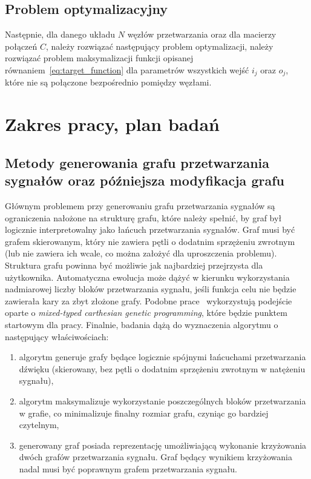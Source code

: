 \subsection{Problem optymalizacyjny}

Następnie, dla danego układu $N$ węzłów przetwarzania oraz dla macierzy połączeń $C$, 
należy rozwiązać następujący problem optymalizacji, należy rozwiązać problem
maksymalizacji funkcji opisanej równaniem~\ref{eq:target_function} dla
parametrów wszystkich wejść $i_j$ oraz $o_j$, które nie są połączone bezpośrednio
pomiędzy węzłami.




\section{Zakres pracy, plan badań}

\subsection{Metody generowania grafu przetwarzania sygnałów oraz późniejsza modyfikacja grafu}

Głównym problemem przy generowaniu grafu przetwarzania sygnałów są ograniczenia nałożone na strukturę grafu,
które należy spełnić, by graf był logicznie interpretowalny jako łańcuch przetwarzania sygnałów.
Graf musi być grafem skierowanym, który nie zawiera pętli o dodatnim sprzężeniu zwrotnym 
(lub nie zawiera ich wcale, co można założyć dla uproszczenia problemu).
Struktura grafu powinna być możliwie jak najbardziej przejrzysta dla użytkownika. 
Automatyczna ewolucja może dążyć w kierunku wykorzystania nadmiarowej liczby
bloków przetwarzania sygnału, jeśli funkcja celu nie będzie zawierała kary za zbyt złożone grafy.
Podobne prace~\cite{evolutionary_puredata} wykorzystują podejście oparte o 
\textit{mixed-typed carthesian genetic programming}, które będzie punktem startowym dla pracy.
Finalnie, badania dążą do wyznaczenia algorytmu o następujący właściwościach:

\begin{enumerate}
    \item algorytm generuje grafy będące logicznie spójnymi łańcuchami przetwarzania dźwięku (skierowany, bez pętli o dodatnim sprzężeniu zwrotnym w natężeniu sygnału),
    \item algorytm maksymalizuje wykorzystanie poszczególnych bloków przetwarzania w grafie, co minimalizuje finalny rozmiar grafu, czyniąc go bardziej czytelnym,
    \item generowany graf posiada reprezentację umożliwiającą wykonanie krzyżowania dwóch grafów przetwarzania sygnału. Graf będący wynikiem krzyżowania nadal musi być poprawnym grafem przetwarzania sygnału.
\end{enumerate}

